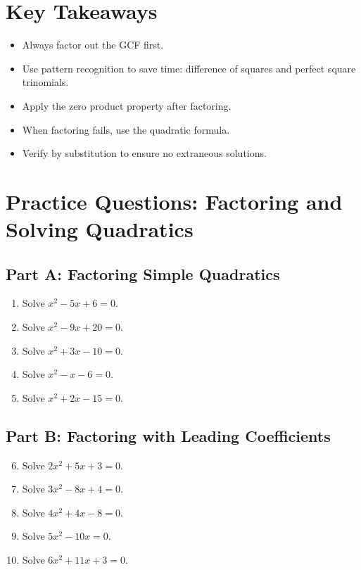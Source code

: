 \documentclass[14pt]{extarticle}
\begin{document}
\section*{Key Takeaways}
\begin{itemize}
  \item Always factor out the GCF first.
  \item Use pattern recognition to save time: difference of squares and perfect square trinomials.
  \item Apply the zero product property after factoring.
  \item When factoring fails, use the quadratic formula.
  \item Verify by substitution to ensure no extraneous solutions.
\end{itemize}

\newpage


\section*{Practice Questions: Factoring and Solving Quadratics}

\subsection*{Part A: Factoring Simple Quadratics}
\begin{enumerate}
  \item Solve \(x^2 - 5x + 6 = 0.\)
  \item Solve \(x^2 - 9x + 20 = 0.\)
  \item Solve \(x^2 + 3x - 10 = 0.\)
  \item Solve \(x^2 - x - 6 = 0.\)
  \item Solve \(x^2 + 2x - 15 = 0.\)
\end{enumerate}

\subsection*{Part B: Factoring with Leading Coefficients}
\begin{enumerate}
  \setcounter{enumi}{5}
  \item Solve \(2x^2 + 5x + 3 = 0.\)
  \item Solve \(3x^2 - 8x + 4 = 0.\)
  \item Solve \(4x^2 + 4x - 8 = 0.\)
  \item Solve \(5x^2 - 10x = 0.\)
  \item Solve \(6x^2 + 11x + 3 = 0.\)
\end{enumerate}
\end{document}
